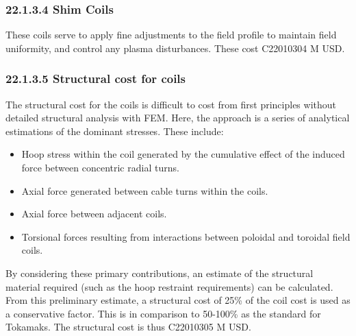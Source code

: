 \subsubsection*{22.1.3.4 Shim Coils}

These coils serve to apply fine adjustments to the field profile to maintain field uniformity, and control any plasma disturbances. These cost C22010304 M USD.\\

\subsubsection*{22.1.3.5 Structural cost for coils}

The structural cost for the coils is difficult to cost from first principles without detailed structural analysis with FEM. Here, the approach is a series of analytical estimations of the dominant stresses. These include:

\begin{itemize}
    \item Hoop stress within the coil generated by the cumulative effect of the induced force between concentric radial turns.
    \item Axial force generated between cable turns within the coils. 
    \item Axial force between adjacent coils.
    \item Torsional forces resulting from interactions between poloidal and toroidal field coils.
\end{itemize}


By considering these primary contributions, an estimate of the structural material required (such as the hoop restraint requirements) can be calculated. From this preliminary estimate, a structural cost of 25\% of the coil cost is used as a conservative factor. This is in comparison to 50-100\% as the standard for Tokamaks. The structural cost is thus C22010305 M USD.


